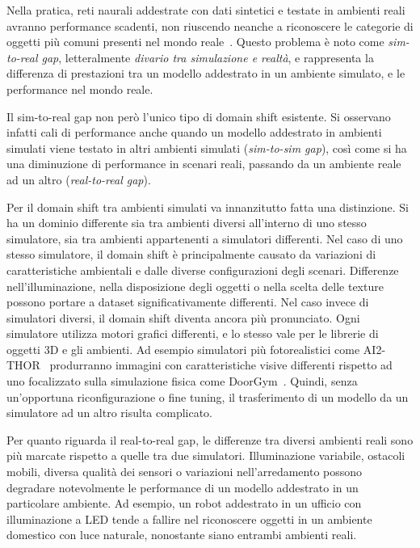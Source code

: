 \documentclass[12pt]{report}
\begin{document}
Nella pratica, reti naurali addestrate con dati sintetici e testate in ambienti reali avranno performance scadenti, non riuscendo neanche a riconoscere le categorie di oggetti più comuni presenti nel mondo reale~\cite{8793591}. Questo problema è noto come \textit{sim-to-real gap}, letteralmente \textit{divario tra simulazione e realtà}, e rappresenta la differenza di prestazioni tra un modello addestrato in un ambiente simulato, e le performance nel mondo reale.

Il sim-to-real gap non però l'unico tipo di domain shift esistente. Si osservano infatti cali di performance anche quando un modello addestrato in ambienti simulati viene testato in altri ambienti simulati (\textit{sim-to-sim gap}), così come si ha una diminuzione di performance in scenari reali, passando da un ambiente reale ad un altro (\textit{real-to-real gap}).

Per il domain shift tra ambienti simulati va innanzitutto fatta una distinzione. Si ha un dominio differente sia tra ambienti diversi all'interno di uno stesso simulatore, sia tra ambienti appartenenti a simulatori differenti. Nel caso di uno stesso simulatore, il domain shift è principalmente causato da variazioni di caratteristiche ambientali e dalle diverse configurazioni degli scenari. Differenze nell'illuminazione, nella disposizione degli oggetti o nella scelta delle texture possono portare a dataset significativamente differenti. Nel caso invece di simulatori diversi, il domain shift diventa ancora più pronunciato. Ogni simulatore utilizza motori grafici differenti, e lo stesso vale per le librerie di oggetti 3D e gli ambienti. Ad esempio simulatori più fotorealistici come AI2-THOR~\cite{kolve2022ai2thorinteractive3denvironment} produrranno immagini con caratteristiche visive differenti rispetto ad uno focalizzato sulla simulazione fisica come DoorGym~\cite{urakami2022doorgymscalabledooropening}. Quindi, senza un'opportuna riconfigurazione o fine tuning, il trasferimento di un modello da un simulatore ad un altro risulta complicato.

Per quanto riguarda il real-to-real gap, le differenze tra diversi ambienti reali sono più marcate rispetto a quelle tra due simulatori. Illuminazione variabile, ostacoli mobili, diversa qualità dei sensori o variazioni nell'arredamento possono degradare notevolmente le performance di un modello addestrato in un particolare ambiente. Ad esempio, un robot addestrato in un ufficio con illuminazione a LED tende a fallire nel riconoscere oggetti in un ambiente domestico con luce naturale, nonostante siano entrambi ambienti reali.
\end{document}
